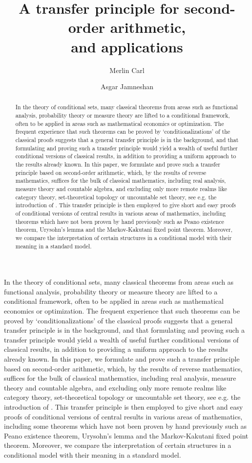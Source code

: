 \documentclass{jloganal}
\title[Transfer principle]{A transfer principle for second-order arithmetic, \\and applications}
\author[M Carl]{Merlin Carl}
\author[A Jamneshan]{Asgar Jamneshan}
\numberwithin{equation}{section}
\theoremstyle{plain}
\begin{document}
\begin{abstract}
In the theory of conditional sets, many classical theorems from areas such as functional analysis, probability theory 
or measure theory are lifted to a conditional framework, often to be applied in areas such as 
mathematical economics or optimization. The frequent experience that
such theorems can be proved by `conditionalizations' of the classical proofs suggests that a general 
transfer principle is in the background, and that formulating and proving such a transfer principle would 
yield a wealth of useful further conditional versions of
classical results, in addition to providing a uniform approach to the results already known. In this paper, 
we formulate and prove such a transfer principle based on second-order arithmetic, which, by the results of 
reverse mathematics, suffices for the bulk of
classical mathematics, including real analysis, measure theory and countable algebra, and excluding only more 
remote realms like category theory, set-theoretical topology or uncountable set theory, see e.g. the introduction of \cite{simpson2009subsystems}.
This transfer principle is then employed to give short and easy proofs of conditional versions of central results 
in various areas of mathematics, including theorems which have not been proven by hand previously such as Peano existence theorem, Urysohn's lemma and the Markov-Kakutani fixed point theorem. 
Moreover, we compare the interpretation of certain structures in a conditional model with their meaning in a standard model. 
\end{abstract}

\begin{asciiabstract}
In the theory of conditional sets, many classical theorems from areas such as functional analysis, probability theory 
or measure theory are lifted to a conditional framework, often to be applied in areas such as 
mathematical economics or optimization. The frequent experience that
such theorems can be proved by `conditionalizations' of the classical proofs suggests that a general 
transfer principle is in the background, and that formulating and proving such a transfer principle would 
yield a wealth of useful further conditional versions of
classical results, in addition to providing a uniform approach to the results already known. In this paper, 
we formulate and prove such a transfer principle based on second-order arithmetic, which, by the results of 
reverse mathematics, suffices for the bulk of
classical mathematics, including real analysis, measure theory and countable algebra, and excluding only more 
remote realms like category theory, set-theoretical topology or uncountable set theory, see e.g. the introduction of \cite{simpson2009subsystems}.
This transfer principle is then employed to give short and easy proofs of conditional versions of central results 
in various areas of mathematics, including some theorems which have not been proven by hand previously such as Peano existence theorem, Urysohn's lemma and the Markov-Kakutani fixed point theorem. 
Moreover, we compare the interpretation of certain structures in a conditional model with their meaning in a standard model. 
\end{asciiabstract}
\end{document}
